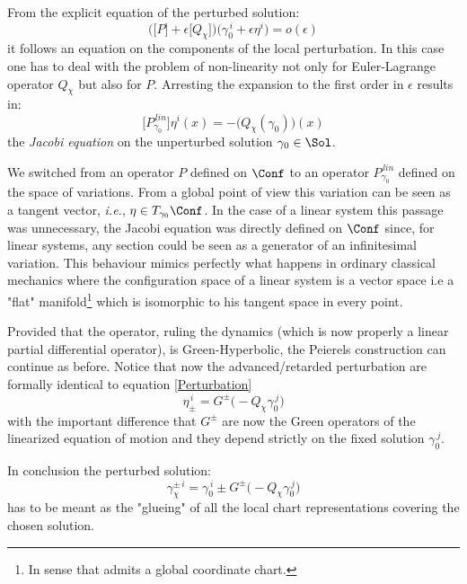 \documentclass[Main]{subfiles}
\begin{document}
		From the explicit equation of the perturbed solution: 
		\begin{displaymath}
			\biggr(\big[P\big] + \epsilon\big[Q_\chi\big] \biggr) \big(\gamma_0^{\,i}+\epsilon \eta^i \big) = o(\epsilon)
		\end{displaymath}
		it follows an equation on the components of the local perturbation.
		In  this case one has to deal with the problem of non-linearity not only for Euler-Lagrange operator $Q_\chi$ but also for $P$.
		Arresting the expansion to the first order in $\epsilon$ results in:
		\begin{equation}\label{PeierlJacobiEqNonLin}
			\biggr[P_{\gamma_0}^{\, lin} \biggr] \eta^i(x) = -\biggr(Q_\chi(\gamma_0)\biggr)(x)
		\end{equation}
		the \emph{Jacobi equation} on the unperturbed solution $\gamma_0\in \Sol$.
		\begin{observation}
			We switched from an operator $P$  defined on  $\Conf$ to an operator  $P_{\gamma_0}^{\, lin}  $ defined on the space of variations.
			From a global point of view this variation can be seen as a tangent vector, \textit{ i.e.}, $\eta \in T_{\gamma_0}\Conf$.
			In the case of a linear system this passage was unnecessary, the Jacobi equation was directly defined on $\Conf$ since, for linear systems, any section could be seen as a generator of an infinitesimal variation.
			This behaviour mimics perfectly what happens in ordinary classical mechanics where the configuration space of a linear system is a vector space i.e a "flat" manifold\footnote{In sense that admits a global coordinate chart.} which is isomorphic to his tangent space in every point.
		\end{observation}
		
		Provided that the %
		 operator, ruling the dynamics
		(which is now properly a linear partial differential operator), is Green-Hyperbolic, the Peierels construction can continue as before.
		Notice that now the advanced/retarded perturbation are formally identical to equation \ref{Perturbation}
		\begin{displaymath}
			\eta_\pm^{\, i} = G^\pm \big( - Q_\chi \gamma_0^{\, j})
		\end{displaymath}
		with the important difference that $G^\pm$ are now the Green operators of the linearized %
		equation of motion
		and they depend strictly on the fixed solution $\gamma_0^{\, j}$.
		
		In conclusion the perturbed solution:
		\begin{displaymath}
			\gamma_{\chi}^{\pm\,i} = \gamma_0^{\, i} \pm G^\pm \big( -Q_\chi \gamma_0^{\,j}\big)
		\end{displaymath}
		has to be meant as the "glueing" of all the local chart representations covering the chosen solution.
\end{document}
